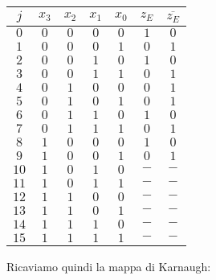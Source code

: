 \documentclass[a4paper,11pt]{article}
\begin{document}
\begin{table}[H]
	\center 
	\begin{tabular} { c | c c c c | c | c }
		$j$ & $x_3$ & $x_2$ & $x_1$ & $x_0$ & $z_E$ & $\overline{z_E}$ \\
		\hline
		$0$ & $0$ & $0$ & $0$ & $0$ & $1$ & $0$ \\
		$1$ & $0$ & $0$ & $0$ & $1$ & $0$ & $1$ \\
		$2$ & $0$ & $0$ & $1$ & $0$ & $1$ & $0$ \\
		$3$ & $0$ & $0$ & $1$ & $1$ & $0$ & $1$ \\

		$4$ & $0$ & $1$ & $0$ & $0$ & $0$ & $1$ \\
		$5$ & $0$ & $1$ & $0$ & $1$ & $0$ & $1$ \\
		$6$ & $0$ & $1$ & $1$ & $0$ & $1$ & $0$ \\
		$7$ & $0$ & $1$ & $1$ & $1$ & $0$ & $1$ \\
	
		$8$ & $1$ & $0$ & $0$ & $0$ & $1$ & $0$ \\
		$9$ & $1$ & $0$ & $0$ & $1$ & $0$ & $1$ \\
		$10$ & $1$ & $0$ & $1$ & $0$ & $-$ & $-$ \\
		$11$ & $1$ & $0$ & $1$ & $1$ & $-$ & $-$ \\

		$12$ & $1$ & $1$ & $0$ & $0$ & $-$ & $-$ \\
		$13$ & $1$ & $1$ & $0$ & $1$ & $-$ & $-$ \\
		$14$ & $1$ & $1$ & $1$ & $0$ & $-$ & $-$ \\
		$15$ & $1$ & $1$ & $1$ & $1$ & $-$ & $-$ \\
	\end{tabular}
\end{table}

Ricaviamo quindi la mappa di Karnaugh:
\end{document}
